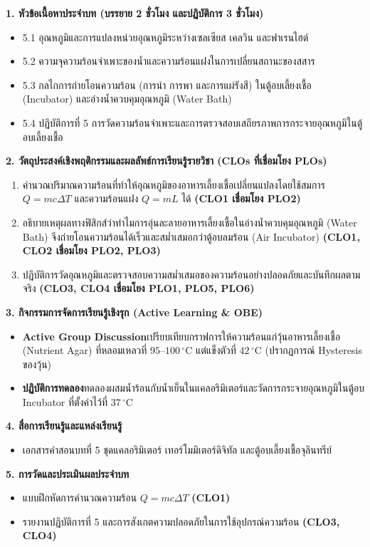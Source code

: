 \cleardoublepage
{}
\begin{planbox}
\noindent\textbf{1. หัวข้อเนื้อหาประจำบท (บรรยาย 2 ชั่วโมง และปฏิบัติการ 3 ชั่วโมง)}
\begin{itemize}
    \item 5.1 อุณหภูมิและการแปลงหน่วยอุณหภูมิระหว่างเซลเซียส เคลวิน และฟาเรนไฮต์
    \item 5.2 ความจุความร้อนจำเพาะของน้ำและความร้อนแฝงในการเปลี่ยนสถานะของสสาร
    \item 5.3 กลไกการถ่ายโอนความร้อน (การนำ การพา และการแผ่รังสี) ในตู้อบเลี้ยงเชื้อ (Incubator) และอ่างน้ำควบคุมอุณหภูมิ (Water Bath)
    \item 5.4 ปฏิบัติการที่ 5 การวัดความร้อนจำเพาะและการตรวจสอบเสถียรภาพการกระจายอุณหภูมิในตู้อบเลี้ยงเชื้อ
\end{itemize}

\noindent\textbf{2. วัตถุประสงค์เชิงพฤติกรรมและผลลัพธ์การเรียนรู้รายวิชา (CLOs ที่เชื่อมโยง PLOs)}
\begin{enumerate}
    \item คำนวณปริมาณความร้อนที่ทำให้อุณหภูมิของอาหารเลี้ยงเชื้อเปลี่ยนแปลงโดยใช้สมการ $Q = mc\Delta T$ และความร้อนแฝง $Q = mL$ ได้ \textbf{(CLO1 เชื่อมโยง PLO2)}
    \item อธิบายเหตุผลทางฟิสิกส์ว่าทำไมการอุ่นละลายอาหารเลี้ยงเชื้อในอ่างน้ำควบคุมอุณหภูมิ (Water Bath) จึงถ่ายโอนความร้อนได้เร็วและสม่ำเสมอกว่าตู้อบลมร้อน (Air Incubator) \textbf{(CLO1, CLO2 เชื่อมโยง PLO2, PLO3)}
    \item ปฏิบัติการวัดอุณหภูมิและตรวจสอบความสม่ำเสมอของความร้อนอย่างปลอดภัยและบันทึกผลตามจริง \textbf{(CLO3, CLO4 เชื่อมโยง PLO1, PLO5, PLO6)}
\end{enumerate}

\noindent\textbf{3. กิจกรรมการจัดการเรียนรู้เชิงรุก (Active Learning \& OBE)}
\begin{itemize}
    \item \textbf{Active Group Discussion}\quad เปรียบเทียบกราฟการให้ความร้อนแก่วุ้นอาหารเลี้ยงเชื้อ (Nutrient Agar) ที่หลอมเหลวที่ $95\text{--}100\,^\circ\text{C}$ แต่แข็งตัวที่ $42\,^\circ\text{C}$ (ปรากฏการณ์ Hysteresis ของวุ้น)
    \item \textbf{ปฏิบัติการทดลอง}\quad ทดลองผสมน้ำร้อนกับน้ำเย็นในแคลอริมิเตอร์และวัดการกระจายอุณหภูมิในตู้อบ Incubator ที่ตั้งค่าไว้ที่ $37\,^\circ\text{C}$
\end{itemize}

\noindent\textbf{4. สื่อการเรียนรู้และแหล่งเรียนรู้}
\begin{itemize}
    \item เอกสารคำสอนบทที่ 5 ชุดแคลอริมิเตอร์ เทอร์โมมิเตอร์ดิจิทัล และตู้อบเลี้ยงเชื้อจุลินทรีย์
\end{itemize}

\noindent\textbf{5. การวัดและประเมินผลประจำบท}
\begin{itemize}
    \item แบบฝึกหัดการคำนวณความร้อน $Q = mc\Delta T$ \textbf{(CLO1)}
    \item รายงานปฏิบัติการที่ 5 และการสังเกตความปลอดภัยในการใช้อุปกรณ์ความร้อน \textbf{(CLO3, CLO4)}
\end{itemize}
\end{planbox}
